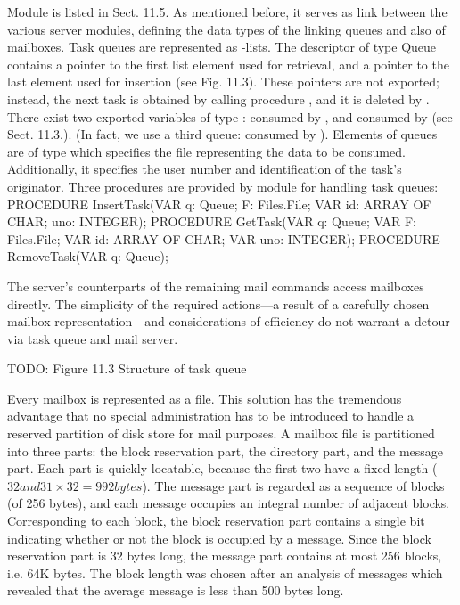 Module  is listed in Sect. 11.5. As mentioned before, it serves as link between the various server modules, defining the data types of the linking queues and also of mailboxes. Task queues are represented as -lists. The descriptor of type Queue contains a pointer to the first list element used for retrieval, and a pointer to the last element used for insertion (see Fig. 11.3). These pointers are not exported; instead, the next task is obtained by calling procedure , and it is deleted by . There exist two exported variables of type :  consumed by , and  consumed by  (see Sect. 11.3.). (In fact, we use a third queue:  consumed by ). Elements of queues are of type  which specifies the file representing the data to be consumed. Additionally, it specifies the user number and identification of the task's originator. Three procedures are provided by module  for handling task queues:
\begintt
PROCEDURE InsertTask(VAR q: Queue; F: Files.File; VAR id: ARRAY OF CHAR; uno: INTEGER);
PROCEDURE GetTask(VAR q: Queue; VAR F: Files.File; VAR id: ARRAY OF CHAR; VAR uno: INTEGER);
PROCEDURE RemoveTask(VAR q: Queue);
\endtt

\noindent The server's counterparts of the remaining mail commands access mailboxes directly. The simplicity of the required actions---a result of a carefully chosen mailbox representation---and considerations of efficiency do not warrant a detour via task queue and mail server.

TODO: Figure 11.3 Structure of task queue

Every mailbox is represented as a file. This solution has the tremendous advantage that no special administration has to be introduced to handle a reserved partition of disk store for mail purposes. A mailbox file is partitioned into three parts: the block reservation part, the directory part, and the message part. Each part is quickly locatable, because the first two have a fixed length ($32 and 31 \times 32 = 992 bytes$). The message part is regarded as a sequence of blocks (of 256 bytes), and each message occupies an integral number of adjacent blocks. Corresponding to each block, the block reservation part contains a single bit indicating whether or not the block is occupied by a message. Since the block reservation part is 32 bytes long, the message part contains at most 256 blocks, i.e. 64K bytes. The block length was chosen after an analysis of messages which revealed that the average message is less than 500 bytes long.

